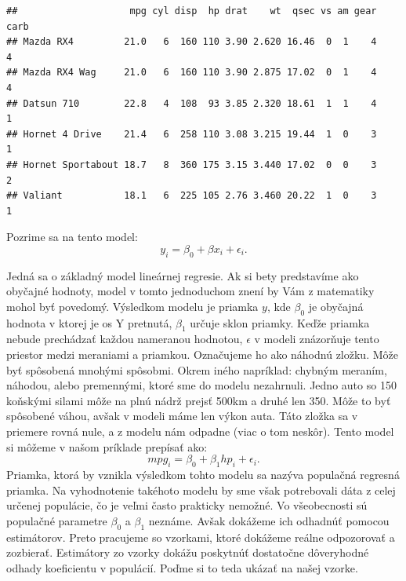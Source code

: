 \begin{verbatim}
##                    mpg cyl disp  hp drat    wt  qsec vs am gear carb
## Mazda RX4         21.0   6  160 110 3.90 2.620 16.46  0  1    4    4
## Mazda RX4 Wag     21.0   6  160 110 3.90 2.875 17.02  0  1    4    4
## Datsun 710        22.8   4  108  93 3.85 2.320 18.61  1  1    4    1
## Hornet 4 Drive    21.4   6  258 110 3.08 3.215 19.44  1  0    3    1
## Hornet Sportabout 18.7   8  360 175 3.15 3.440 17.02  0  0    3    2
## Valiant           18.1   6  225 105 2.76 3.460 20.22  1  0    3    1
\end{verbatim}

\begin{Shaded}
\begin{Highlighting}[]
\end{Highlighting}
\end{Shaded}

Pozrime sa na tento model:
\[y_i = \beta_0 + \beta{x_i} + \epsilon_i.\]

Jedná sa o základný model lineárnej regresie. Ak si bety predstavíme ako
obyčajné hodnoty, model v tomto jednoduchom znení by Vám z matematiky
mohol byť povedomý. Výsledkom modelu je priamka \(y\), kde \(\beta_0\)
je obyčajná hodnota v ktorej je os Y pretnutá, \(\beta_1\) určuje sklon
priamky. Keďže priamka nebude prechádzať každou nameranou hodnotou,
\(\epsilon\) v modeli znázorňuje tento priestor medzi meraniami a
priamkou. Označujeme ho ako náhodnú zložku. Môže byť spôsobená mnohými
spôsobmi. Okrem iného napríklad: chybným meraním, náhodou, alebo
premennými, ktoré sme do modelu nezahrnuli. Jedno auto so 150 koňskými
silami môže na plnú nádrž prejsť 500km a druhé len 350. Môže to byť
spôsobené váhou, avšak v modeli máme len výkon auta. Táto zložka sa v
priemere rovná nule, a z modelu nám odpadne (viac o tom neskôr). Tento
model si môžeme v našom príklade prepísať ako:
\[mpg_i = \beta_0 + \beta_1{hp_i} + \epsilon_i.\] Priamka, ktorá by
vznikla výsledkom tohto modelu sa nazýva populačná regresná priamka. Na
vyhodnotenie takéhoto modelu by sme však potrebovali dáta z celej
určenej populácie, čo je veľmi často prakticky nemožné. Vo všeobecnosti
sú populačné parametre \(\beta_0\) a \(\beta_1\) neznáme. Avšak dokážeme
ich odhadnúť pomocou estimátorov. Preto pracujeme so vzorkami, ktoré
dokážeme reálne odpozorovať a zozbierať. Estimátory zo vzorky dokážu
poskytnúť dostatočne dôveryhodné odhady koeficientu v populácií. Poďme
si to teda ukázať na našej vzorke.

